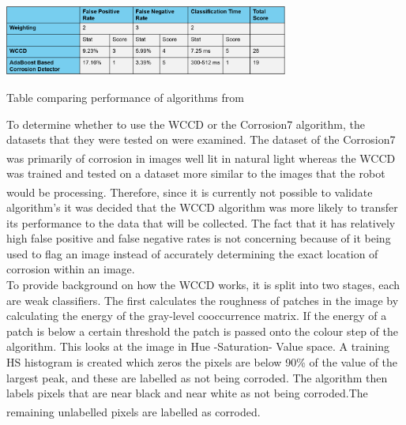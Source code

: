 \documentclass[11pt]{article}		%
\newcommand{\supercite}[1]{\textsuperscript{\cite{#1}}}		%
\begin{document}
			\begin{table}[h]
				\centering
				\includegraphics[width=0.7\textwidth]{WCCD_corrosion_table}
				\caption{Table comparing performance of algorithms from \cite{WCCD}}
				\label{WCCD_comparison}
			\end{table}
		 To determine whether to use the WCCD or the Corrosion7 algorithm, the datasets that they were tested on were examined. The dataset of the Corrosion7 was primarily of corrosion in images well lit in natural light\supercite{Corrosion7} whereas the WCCD was trained and tested on a dataset more similar to the images that the robot would be processing.\supercite{WCCD} Therefore, since it is currently not possible to validate algorithm’s it was decided that the WCCD algorithm was more likely to transfer its performance to the data that will be collected. The fact that it has relatively high false positive and false negative rates is not concerning because of it being used to flag an image instead of accurately determining the exact location of corrosion within an image.
	      \\ \hspace*{3ex}
		    To provide background on how the WCCD works, it is split into two stages, each are weak classifiers. The first calculates the roughness of patches in the image by calculating the energy of the gray-level cooccurrence matrix. If the energy of a patch is below a certain threshold the patch is passed onto the colour step of the algorithm. This looks at the image in Hue -Saturation- Value space. A training HS histogram is created which zeros the pixels are below 90\% of the value of the largest peak, and these are labelled as not being corroded. The algorithm then labels pixels that are near black and near white as not being corroded.The remaining unlabelled pixels are labelled as corroded\supercite{WCCD}. 
		   \\ \hspace*{3ex}
\end{document}
